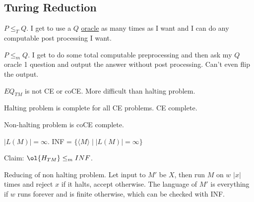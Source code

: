 \documentclass[../598comp.tex]{subfiles}
\begin{document}
\subsection{Turing Reduction}

$P \leq_T Q$. I get to use a $Q$ \ul{oracle} as many times as I want and I can
do any computable post processing I want.

$P \leq_m Q$. I get to do some total computable preprocessing and then ask my
$Q$ oracle 1 question and output the answer without post processing. Can't even
flip the output.

\begin{theorem}
  $EQ_{TM}$ is not CE or coCE. More difficult than halting problem.
\end{theorem}
\begin{fact}
  Halting problem is complete for all CE problems. CE complete.

  Non-halting problem is coCE complete.
\end{fact}

$|L(M)| = \infty$. INF = $\{\langle M \rangle \mid |L(M)| = \infty\}$

Claim: $\ol{H_{TM}} \leq_m INF$.

Reducing of non halting problem. Let input to $M'$ be $X$, then run $M$ on $w$ $|x|$
times and reject $x$ if it halts, accept otherwise. The language of $M'$ is
everything if $w$ runs forever and is finite otherwise, which can be checked
with INF.
\end{document}
